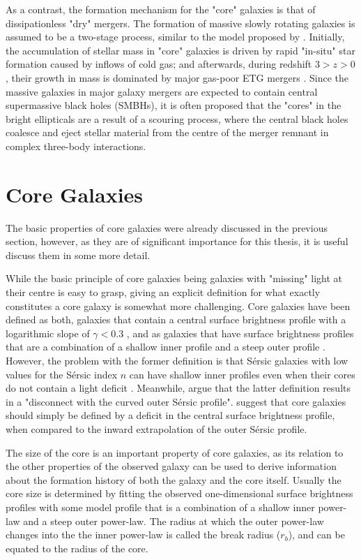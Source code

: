 \documentclass[english, oneside]{HYgradu}
\begin{document}
As a contrast, the formation mechanism for the "core" galaxies is that of dissipationless "dry" mergers. The formation of massive slowly rotating galaxies is assumed to be a two-stage process, similar to the model proposed by \cite{Oser2010}. Initially, the accumulation of stellar mass in "core" galaxies is driven by rapid "in-situ" star formation caused by inflows of cold gas; and afterwards, during redshift $3 > z > 0$, their growth in mass is dominated by major gas-poor ETG mergers \citep{Naab2009}. Since the massive galaxies in major galaxy mergers are expected to contain central supermassive black holes (SMBHs), it is often proposed that the "cores" in the bright ellipticals are a result of a scouring process, where the central black holes coalesce and eject stellar material from the centre of the merger remnant in complex three-body interactions.

\section{Core Galaxies}

The basic properties of core galaxies were already discussed in the previous section, however, as they are of significant importance for this thesis, it is useful discuss them in some more detail.

While the basic principle of core galaxies being galaxies with "missing" light at their centre is easy to grasp, giving an explicit definition for what exactly constitutes a core galaxy is somewhat more challenging. Core galaxies have been defined as both, galaxies that contain a central surface brightness profile with a logarithmic slope of $\gamma < 0.3$ \citep{Lauer1995, Lauer2007}, and as galaxies that have surface brightness profiles that are a combination of a shallow inner profile and a steep outer profile \citep{Kormendy1999}. However, the problem with the former definition is that Sérsic galaxies with low values for the Sérsic index $n$ can have shallow inner profiles even when their cores do not contain a light deficit \citep{Graham2003}. Meanwhile, \cite{Dullo2012} argue that the latter definition results in a "disconnect with the curved outer Sérsic profile". \cite{Graham2003} suggest that core galaxies should simply be defined by a deficit in the central surface brightness profile, when compared to the inward extrapolation of the outer Sérsic profile.

The size of the core is an important property of core galaxies, as its relation to the other properties of the observed galaxy can be used to derive information about the formation history of both the galaxy and the core itself. Usually the core size is determined by fitting the observed one-dimensional surface brightness profiles with some model profile that is a combination of a shallow inner power-law and a steep outer power-law. The radius at which the outer power-law changes into the the inner power-law is called the break radius ($r_b$), and can be equated to the radius of the core.
\end{document}
